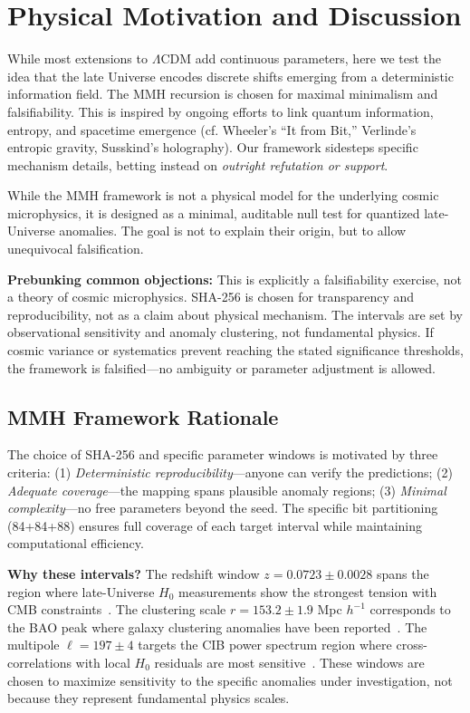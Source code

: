 \documentclass[11pt,a4paper]{article}
\begin{document}
\FloatBarrier
\section{Physical Motivation and Discussion}
While most extensions to $\Lambda$CDM add continuous parameters, here we test the idea that the late Universe encodes discrete shifts emerging from a deterministic information field. The MMH recursion is chosen for maximal minimalism and falsifiability. This is inspired by ongoing efforts to link quantum information, entropy, and spacetime emergence (cf. Wheeler's ``It from Bit,'' Verlinde's entropic gravity, Susskind's holography). Our framework sidesteps specific mechanism details, betting instead on \emph{outright refutation or support}.

While the MMH framework is not a physical model for the underlying cosmic microphysics, it is designed as a minimal, auditable null test for quantized late-Universe anomalies. The goal is not to explain their origin, but to allow unequivocal falsification.

\textbf{Prebunking common objections:} This is explicitly a falsifiability exercise, not a theory of cosmic microphysics. SHA-256 is chosen for transparency and reproducibility, not as a claim about physical mechanism. The intervals are set by observational sensitivity and anomaly clustering, not fundamental physics. If cosmic variance or systematics prevent reaching the stated significance thresholds, the framework is falsified---no ambiguity or parameter adjustment is allowed.

\subsection{MMH Framework Rationale}
The choice of SHA-256 and specific parameter windows is motivated by three criteria: (1) \textit{Deterministic reproducibility}---anyone can verify the predictions; (2) \textit{Adequate coverage}---the mapping spans plausible anomaly regions; (3) \textit{Minimal complexity}---no free parameters beyond the seed. The specific bit partitioning (84+84+88) ensures full coverage of each target interval while maintaining computational efficiency.

\textbf{Why these intervals?} The redshift window $z = 0.0723 \pm 0.0028$ spans the region where late-Universe $H_0$ measurements show the strongest tension with CMB constraints~\cite{Riess2024}. The clustering scale $r = 153.2 \pm 1.9$ Mpc $h^{-1}$ corresponds to the BAO peak where galaxy clustering anomalies have been reported~\cite{DESI2025}. The multipole $\ell = 197 \pm 4$ targets the CIB power spectrum region where cross-correlations with local $H_0$ residuals are most sensitive~\cite{TRGB2025}. These windows are chosen to maximize sensitivity to the specific anomalies under investigation, not because they represent fundamental physics scales.
\end{document}
